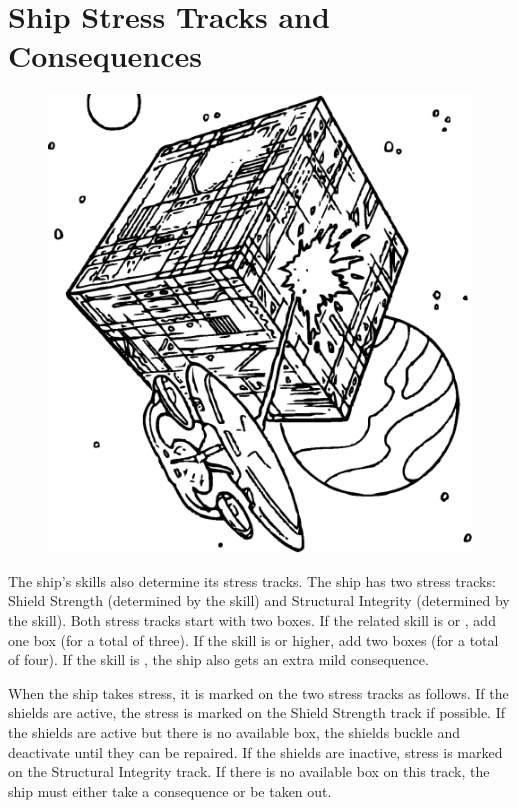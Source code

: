 \documentclass[12pt,titlepage,openany]{book}
\begin{document}
\section{Ship Stress Tracks and Consequences}\label{sec:ship-stress}

\begin{figure}
    \centering
    \includegraphics[width=0.9\linewidth]{img/Borg.eps}\\
\end{figure}

The ship's skills also determine its stress tracks. The ship has two stress
tracks: Shield Strength (determined by the  skill) and
Structural Integrity (determined by the  skill). Both stress
tracks start with two boxes. If the related skill is  or
, add one box (for a total of three). If the skill is 
or higher, add two boxes (for a total of four). If the skill is ,
the ship also gets an extra mild consequence.

When the ship takes stress, it is marked on the two stress tracks as follows.
If the shields are active, the stress is marked on the Shield Strength track if
possible. If the shields are active but there is no available box, the shields
buckle and deactivate until they can be repaired. If the shields are inactive,
stress is marked on the Structural Integrity track. If there is no available
box on this track, the ship must either take a consequence or be taken out.
\end{document}
